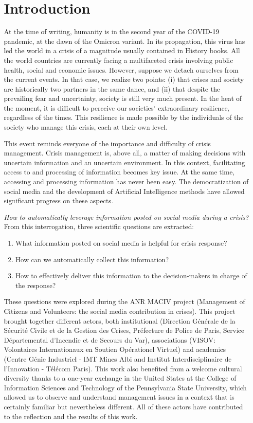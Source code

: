 \chapter*{Introduction}
At the time of writing, humanity is in the second year of the COVID-19 pandemic, at the dawn of the Omicron variant.
In its propagation, this virus has led the world in a crisis of a magnitude usually contained in History books.
All the world countries are currently facing a multifaceted crisis involving public health, social and economic issues.
However, suppose we detach ourselves from the current events.
In that case, we realize two points: (i) that crises and society are historically two partners in the same dance, and (ii) that despite the prevailing fear and uncertainty, society is still very much present.
In the heat of the moment, it is difficult to perceive our societies' extraordinary resilience, regardless of the times.
This resilience is made possible by the individuals of the society who manage this crisis, each at their own level.

This event reminds everyone of the importance and difficulty of crisis management.
Crisis management is, above all, a matter of making decisions with uncertain information and an uncertain environment.
In this context, facilitating access to and processing of information becomes key issue.
At the same time, accessing and processing information has never been easy.
The democratization of social media and the development of Artificial Intelligence methods have allowed significant progress on these aspects.

\emph{How to automatically leverage information posted on social media during a crisis?}
From this interrogation, three scientific questions are extracted:

\begin{enumerate}
    \item What information posted on social media is helpful for crisis response?
    \item How can we automatically collect this information?
    \item How to effectively deliver this information to the decision-makers in charge of the response?
\end{enumerate}

These questions were explored during the ANR MACIV project (Management of Citizens and Volunteers: the social media contribution in crises).
This project brought together different actors, both institutional (Direction Générale de la Sécurité Civile et de la Gestion des Crises, Préfecture de Police de Paris, Service Départemental d'Incendie et de Secours du Var),
associations (VISOV: Volontaires Internationaux en Soutien Opérationel Virtuel) and academics (Centre Génie Industriel - IMT Mines Albi and Institut Interdisciplinaire de l'Innovation - Télécom Paris).
This work also benefited from a welcome cultural diversity thanks to a one-year exchange in the United States at the College of Information Sciences and Technology of the Pennsylvania State University, which allowed us to observe and understand management issues in a context that is certainly familiar but nevertheless different.
All of these actors have contributed to the reflection and the results of this work.

